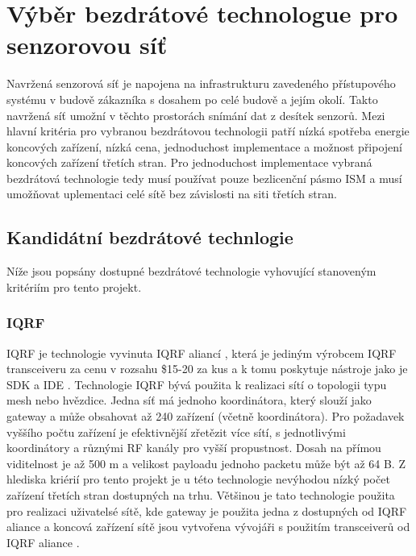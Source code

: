  \chapter{Výběr bezdrátové technologue pro senzorovou síť}
Navržená senzorová síť je napojena na infrastrukturu zavedeného přístupového systému v budově zákazníka s dosahem po celé budově a jejím okolí. Takto navržená síť umožní v těchto prostorách snímání dat z desítek senzorů.
Mezi hlavní kritéria pro vybranou bezdrátovou technologii patří nízká spotřeba energie koncových zařízení, nízká cena, jednoduchost implementace a možnost připojení koncových zařízení třetích stran.
Pro jednoduchost implementace vybraná bezdrátová technologie tedy musí používat pouze bezlicenční pásmo ISM a musí umožňovat uplementaci celé sítě bez závislosti na siti třetích stran. 

\section{Kandidátní bezdrátové technlogie}
Níže jsou popsány dostupné bezdrátové technologie vyhovující stanoveným kritériím pro tento projekt.

\subsection{IQRF}
IQRF je technologie vyvinuta IQRF aliancí \cite{iqrf_alliance}, která je jediným výrobcem IQRF transceiveru \cite{iqrf_transceivers} za cenu v rozsahu \$15-20 za kus a k tomu poskytuje nástroje jako je SDK \cite{iqrf_sdk} a IDE \cite{iqrf_ide}.
Technologie IQRF bývá použita k realizaci sítí o topologii typu mesh nebo hvězdice.
Jedna síť má jednoho koordinátora, který slouží jako gateway a může obsahovat až 240 zařízení (včetně koordinátora). Pro požadavek vyššího počtu zařízení je efektivnější zřetězit více sítí, s jednotlivými koordinátory a různými RF kanály pro vyšší propustnost.
Dosah na přímou viditelnost je až 500 m a velikost payloadu jednoho packetu může být až 64 B.
Z hlediska kriérií pro tento projekt je u této technologie nevýhodou nízký počet zařízení třetích stran dostupných na trhu. 
Většinou je tato technologie použita pro realizaci uživatelsé sítě, kde gateway je použita jedna z dostupných od IQRF aliance a koncová zařízení sítě jsou vytvořena vývojáři s použitím transceiverů od IQRF aliance
\cite{paper_iqrf}.


